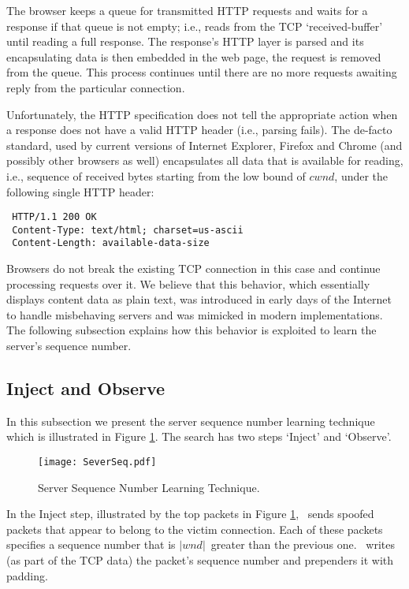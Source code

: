 \documentclass[conference]{IEEEtran}
\newcommand{\wndsize}{$\left|\textit{wnd}\right|$}
\newcommand{\cwnd}{$\textit{cwnd}$}
\begin{document}
The browser keeps a queue for transmitted HTTP requests and waits for a response if that queue is not empty; i.e., reads from the TCP `received-buffer' until reading a full response. The response's HTTP layer is parsed and its encapsulating data is then embedded in the web page, the request is removed from the queue. This process continues until there are no more requests awaiting reply from the particular connection.

Unfortunately, the HTTP specification does not tell the appropriate action when a response does not have a valid HTTP header (i.e., parsing fails). The de-facto standard, used by current versions of Internet Explorer, Firefox and Chrome (and possibly other browsers as well) encapsulates all data that is available for reading, i.e., sequence of received bytes starting from the low bound of \cwnd, under the following single HTTP header:

\begin{verbatim}
 HTTP/1.1 200 OK
 Content-Type: text/html; charset=us-ascii
 Content-Length: available-data-size
\end{verbatim}

Browsers do not break the existing TCP connection in this case and continue processing requests over it. We believe that this behavior, which essentially displays content data as plain text, was introduced in early days of the Internet to handle misbehaving servers and was mimicked in modern implementations. The following subsection explains how this behavior is exploited to learn the server's sequence number.

\subsection{Inject and Observe} \label{serversnum}
In this subsection we present the server sequence number learning technique which is illustrated in Figure \ref{fig:injectandobserve}. The search has two steps `Inject' and `Observe'.

\begin{figure}
  \begin{center}
    \texttt{[image: SeverSeq.pdf]}
  \end{center}
  \caption{Server Sequence Number Learning Technique.}
    \label{fig:injectandobserve}
\end{figure}


In the Inject step, illustrated by the top packets in Figure \ref{fig:injectandobserve}, \mal\ sends spoofed packets that appear to belong to the victim connection. Each of these packets specifies a sequence number that is \wndsize\ greater than the previous one. \mal\ writes (as part of the TCP data) the packet's sequence number and prependers it with padding. 
\end{document}
